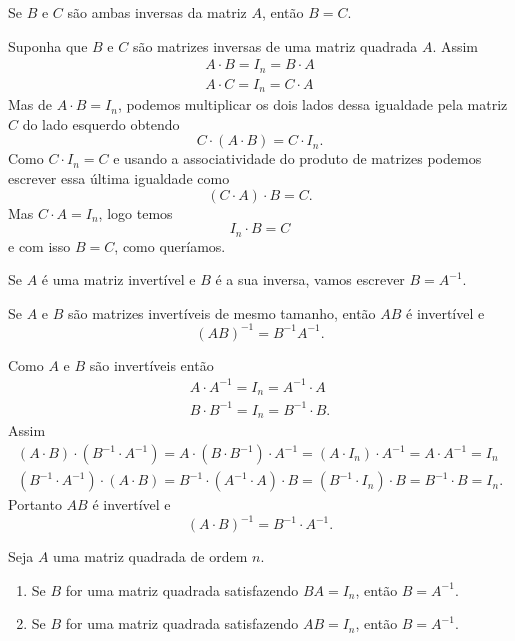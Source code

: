 \begin{teorema}
    Se $B$ e $C$ são ambas inversas da matriz $A$, então $B = C$.
\end{teorema}
\begin{prova}
    Suponha que $B$ e $C$ são matrizes inversas de uma matriz quadrada $A$. Assim
    \begin{align*}
        A\cdot B = I_n = B\cdot A\\
        A\cdot C = I_n = C\cdot A
    \end{align*}
    Mas de $A\cdot B = I_n$, podemos multiplicar os dois lados dessa igualdade pela matriz $C$ do lado esquerdo obtendo
    \[
        C\cdot (A\cdot B) = C\cdot I_n.
    \]
    Como $C\cdot I_n = C$ e usando a associatividade do produto de matrizes podemos escrever essa última igualdade como
    \[
        (C\cdot A)\cdot B = C.
    \]
    Mas $C\cdot A = I_n$, logo temos
    \[
        I_n\cdot B = C
    \]
    e com isso $B = C$, como queríamos.
\end{prova}

\begin{notacao}
    Se $A$ é uma matriz invertível e $B$ é a sua inversa, vamos escrever $B = A^{-1}$.
\end{notacao}

\begin{proposicao}
    Se $A$ e $B$ são matrizes invertíveis de mesmo tamanho, então $AB$ é invertível e
    \[
        (AB)^{-1} = B^{-1} A^{-1}.
    \]
\end{proposicao}
\begin{prova}
    Como $A$ e $B$ são invertíveis então
    \begin{align*}
        A\cdot A^{-1} = I_n = A^{-1}\cdot A\\
        B\cdot B^{-1} = I_n = B^{-1}\cdot B.
    \end{align*}
    Assim
    \begin{align*}
        (A\cdot B)\cdot (B^{-1}\cdot A^{-1}) = A \cdot (B \cdot B^{-1})\cdot A^{-1} = (A \cdot I_n) \cdot A^{-1} = A\cdot A^{-1} = I_n\\
        (B^{-1}\cdot A^{-1}) \cdot (A\cdot B) = B^{-1}\cdot (A^{-1} \cdot A)\cdot B = (B^{-1} \cdot I_n) \cdot B = B^{-1}\cdot B = I_n.
    \end{align*}
    Portanto $AB$ é invertível e
    \[
        (A\cdot B)^{-1} = B^{-1}\cdot A^{-1}.
    \]
\end{prova}

\begin{teorema}
    Seja $A$ uma matriz quadrada de ordem $n$.
    \begin{enumerate}[label={\roman*})]
        \item Se $B$ for uma matriz quadrada satisfazendo $BA = I_n$, então $B = A^{-1}$.
        \item Se $B$ for uma matriz quadrada satisfazendo $AB = I_n$, então $B = A^{-1}$.
    \end{enumerate}
\end{teorema}

